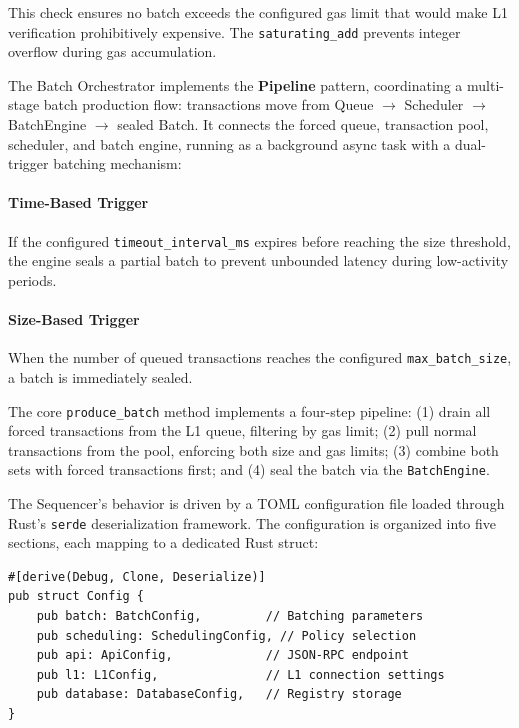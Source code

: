 This check ensures no batch exceeds the configured gas limit that would make L1 verification prohibitively expensive. The \texttt{saturating\_add} prevents integer overflow during gas accumulation.


The Batch Orchestrator implements the \textbf{Pipeline} pattern, coordinating a multi-stage batch production flow: transactions move from Queue $\rightarrow$ Scheduler $\rightarrow$ BatchEngine $\rightarrow$ sealed Batch. It connects the forced queue, transaction pool, scheduler, and batch engine, running as a background async task with a dual-trigger batching mechanism:

\paragraph{Time-Based Trigger}
If the configured \texttt{timeout\_interval\_ms} expires before reaching the size threshold, the engine seals a partial batch to prevent unbounded latency during low-activity periods.

\paragraph{Size-Based Trigger}
When the number of queued transactions reaches the configured \texttt{max\_batch\_size}, a batch is immediately sealed.

The core \texttt{produce\_batch} method implements a four-step pipeline: (1) drain all forced transactions from the L1 queue, filtering by gas limit; (2) pull normal transactions from the pool, enforcing both size and gas limits; (3) combine both sets with forced transactions first; and (4) seal the batch via the \texttt{BatchEngine}.

\label{sec:batch-config}

The Sequencer's behavior is driven by a TOML configuration file loaded through Rust's \texttt{serde} deserialization framework. The configuration is organized into five sections, each mapping to a dedicated Rust struct:

\begin{lstlisting}[style=rustStyle, caption={Configuration structure hierarchy}, label={lst:config-structs}]
#[derive(Debug, Clone, Deserialize)]
pub struct Config {
    pub batch: BatchConfig,         // Batching parameters
    pub scheduling: SchedulingConfig, // Policy selection
    pub api: ApiConfig,             // JSON-RPC endpoint
    pub l1: L1Config,               // L1 connection settings
    pub database: DatabaseConfig,   // Registry storage
}
\end{lstlisting}

